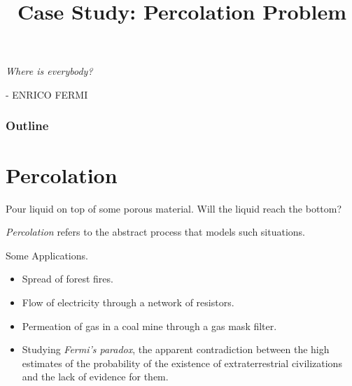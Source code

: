 \documentclass[8pt,a4paper,compress,handout]{beamer}
\title{Case Study: Percolation Problem}
\date{}
\begin{document}
\begin{frame}
\hfill
\begin{minipage}{150pt}
\begin{flushright}
\tiny \emph{Where is everybody?}

\smallskip

- ENRICO FERMI
\end{flushright}
\end{minipage}
\vfill
\titlepage
\end{frame}

\begin{frame}
\frametitle{Outline}
\tableofcontents
\end{frame}

\section{Percolation}
\begin{frame}[fragile]
Pour liquid on top of some porous material. Will the liquid reach the bottom? 

\bigskip

\emph{Percolation} refers to the abstract process that models such situations.

\bigskip

Some Applications.
\begin{itemize}
\item Spread of forest fires.
\item Flow of electricity through a network of resistors.
\item Permeation of gas in a coal mine through a gas mask filter.
\item Studying \emph{Fermi's paradox}, the apparent contradiction between the high estimates of the probability of the existence of extraterrestrial civilizations and the lack of evidence for them.
\end{itemize}
\end{frame}
\end{document}
